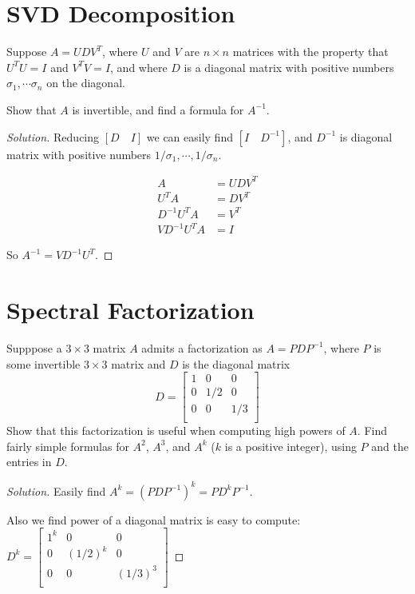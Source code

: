 \section{SVD Decomposition}
\begin{problem}
    Suppose \(A = UDV^T\), where \(U\) and \(V\) are \(n \times n\) matrices with the property that \(U^T U = I\) and \(V^T V = I\),
    and where \(D\) is a diagonal matrix with positive numbers \(\sigma_1, \cdots \sigma_n \) on the diagonal.        

    Show that \(A\) is invertible, and find a formula for \(A ^{-1}\).  
\end{problem}
\begin{proof}[Solution]
    Reducing \([D \quad I]\) we can easily find \([I \quad D^{-1}]\), and \(D^{-1}\) is diagonal matrix with positive numbers \(1/\sigma_1, \cdots, 1/\sigma_n\).  

    \begin{align*}
        A &= UDV^T \\
        U^TA &= DV^T \\
        D^{-1} U^T A &= V^T \\
        V D^{-1} U^T A &= I
    \end{align*}

    So \(A^{-1} = VD^{-1} U^T\).
\end{proof}

\section{Spectral Factorization}
\begin{problem}
    Supppose a \(3 \times 3\) matrix \(A\) admits a factorization as \(A = PDP^{-1}\),
    where \(P\) is some invertible \(3 \times 3\) matrix and \(D\) is the diagonal matrix     
    \[
        D = \begin{bmatrix}
            1 & 0 &  0 \\
            0 & 1/2 &  0 \\
            0 & 0 &  1/3 \\
        \end{bmatrix}   
    \]
    Show that this factorization is useful when computing high powers of \(A\). 
    Find fairly simple formulas for \(A^2\), \(A^3\), and \(A^k\) (\(k\) is a positive integer), using \(P\) and the entries in \(D\).   
\end{problem}
\begin{proof}[Solution]
    Easily find \(A^k = (PDP^{-1})^k = P D^k P^{-1}\).  

    Also we find power of a diagonal matrix is easy to compute:
    \(D^k = \begin{bmatrix}
        1^k & 0 & 0  \\
        0 & (1/2)^k & 0  \\
        0 & 0 & (1/3)^3  \\
    \end{bmatrix}\) 
\end{proof}

